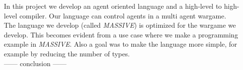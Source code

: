 In this project we develop an agent oriented language and a high-level to high-level compiler. Our language can control agents in a multi agent wargame.\\ \indent
The language we develop (called \textit{MASSIVE}) is optimized for the wargame we develop. This becomes evident from a use case where we make a programming example in \textit{MASSIVE}. Also a goal was to make the language more simple, for example by reducing the number of types.\\ \indent
------ conclusion ------
